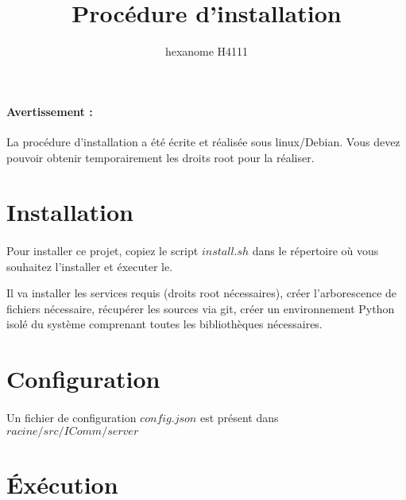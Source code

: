 \documentclass[10pt,a4paper]{article}
\author{hexanome H4111}
\title{Procédure d'installation}
\begin{document}
\paragraph{Avertissement : }La procédure d'installation a été écrite et réalisée sous linux/Debian. Vous devez pouvoir obtenir temporairement les droits root pour la réaliser.
\section{Installation}
\paragraph{} Pour installer ce projet, copiez le script $install.sh$ dans le répertoire où vous souhaitez l'installer et éxecuter le.

Il va installer les services requis (droits root nécessaires), créer l'arborescence de fichiers nécessaire, récupérer les sources via git, créer un environnement Python isolé du système comprenant toutes les bibliothèques nécessaires.

\section{Configuration}
\paragraph{} Un fichier de configuration $config.json$ est présent dans $racine/src/IComm/server$
\section{\'{E}xécution}
\end{document}
